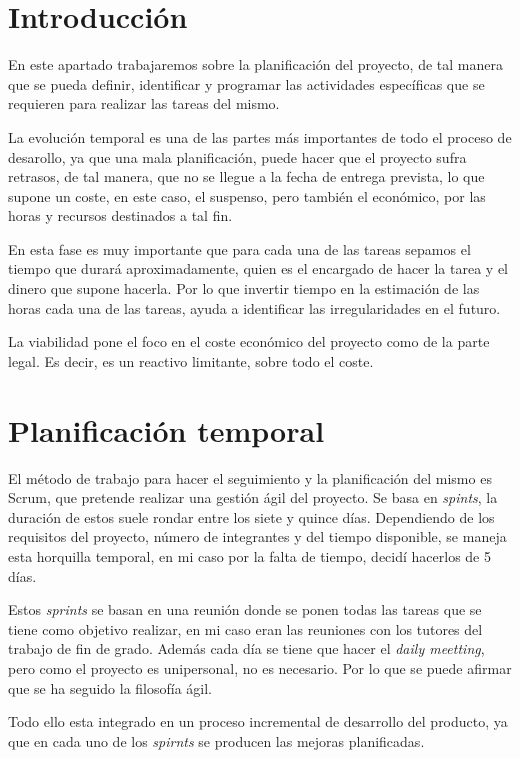 
\section{Introducción}
En este apartado trabajaremos sobre la planificación del proyecto, de tal manera que se pueda definir, identificar y programar las actividades específicas que se requieren para realizar las tareas del mismo. 

La evolución temporal es una de las partes más importantes de todo el proceso de desarollo, ya que una mala planificación, puede hacer que el proyecto sufra retrasos, de tal manera, que no se llegue a la fecha de entrega prevista, lo que supone un coste, en este caso, el suspenso, pero también el económico, por las horas y recursos destinados a tal fin.

 En esta fase es muy importante que para cada una de las tareas sepamos el tiempo que durará aproximadamente, quien es el encargado de hacer la tarea y el dinero que supone hacerla. Por lo que invertir tiempo en la estimación de las horas cada una de las tareas, ayuda a identificar las irregularidades en el futuro.

La viabilidad pone el foco en el coste económico del proyecto como de la parte legal. Es decir, es un reactivo limitante, sobre todo el coste.

\section{Planificación temporal}
El método de trabajo para hacer el seguimiento y la planificación del mismo es Scrum, que pretende realizar una gestión ágil del proyecto. Se basa en \emph{spints}, la duración de estos suele rondar entre los siete y quince días. Dependiendo de los requisitos del proyecto, número de integrantes y del tiempo disponible, se maneja esta horquilla temporal, en mi caso por la falta de tiempo, decidí hacerlos de 5 días. 

Estos \emph{sprints} se basan en una reunión donde se ponen todas las tareas que se tiene como objetivo realizar, en mi caso eran las reuniones con los tutores del trabajo de fin de grado. Además cada día se tiene que hacer el \emph{daily meetting}, pero como el proyecto es unipersonal, no es necesario. Por lo que se puede afirmar que se ha seguido la filosofía ágil.

Todo ello esta integrado en un proceso incremental de desarrollo del producto, ya que en cada uno de los \emph{spirnts} se producen las mejoras planificadas.

